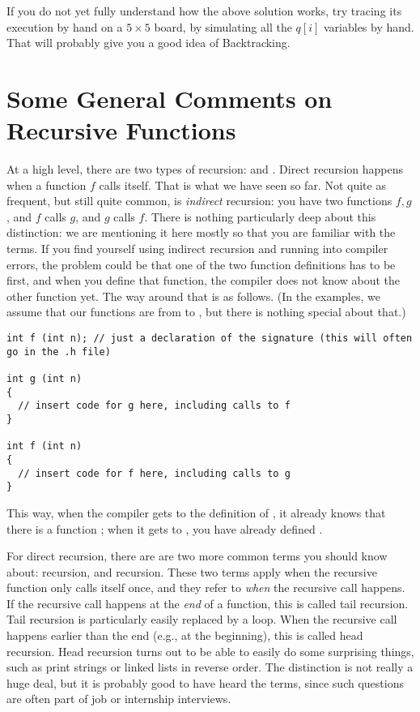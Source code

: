 If you do not yet fully understand how the above solution works, 
try tracing its execution by hand on a $5 \times 5$ board, by
simulating all the $q[i]$ variables by hand.
That will probably give you a good idea of Backtracking.

\section{Some General Comments on Recursive Functions}

At a high level, there are two types of recursion:
 and . 
Direct recursion happens when a function $f$ calls itself.
That is what we have seen so far.
Not quite as frequent, but still quite common, is \emph{indirect}
recursion: you have two functions $f,g$, and $f$ calls $g$, and $g$
calls $f$.
There is nothing particularly deep about this distinction:
we are mentioning it here mostly so that you are familiar with the
terms.
If you find yourself using indirect recursion and running into
compiler errors, the problem could be that one of the two function
definitions has to be first, and when you define that function,
the compiler does not know about the other function yet.
The way around that is as follows. (In the examples, we assume that our
functions are from  to , but there is nothing
special about that.)

\begin{verbatim}
int f (int n); // just a declaration of the signature (this will often go in the .h file)

int g (int n)
{ 
  // insert code for g here, including calls to f
}

int f (int n)
{ 
  // insert code for f here, including calls to g
}
\end{verbatim}

This way, when the compiler gets to the definition of ,
it already knows that there is a function ;
when it gets to , you have already defined .

\medskip

For direct recursion, there are are two more common terms you
should know about:  recursion, and
 recursion. 
These two terms apply when the recursive function only calls itself
once, and they refer to \emph{when} the recursive call happens.
If the recursive call happens at the \emph{end} of a function,
this is called tail recursion.
Tail recursion is particularly easily replaced by a loop.
When the recursive call happens earlier than the end (e.g., at the
beginning), this is called head recursion.
Head recursion turns out to be able to easily do some surprising
things, such as print strings or linked lists in reverse order.
The distinction is not really a huge deal,
but it is probably good to have heard the terms,
since such questions are often part of job or internship interviews.

